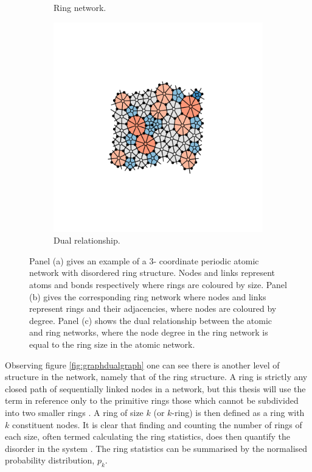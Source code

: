 \begin{figure}[bt]
\begin{subfigure}[b]{0.3\textwidth}
         \caption{Ring network.}
         \label{fig:graphdualdual}
     \end{subfigure}
     \hfill
     \begin{subfigure}[b]{0.3\textwidth}
         \centering
         \includegraphics[width=\textwidth]{./figures/methods/graph_dual.pdf}
         \caption{Dual relationship.}
         \label{}
     \end{subfigure}
     \hfill
     
     \caption{Panel (a) gives an example of a 3\-- coordinate periodic atomic network with disordered ring structure. Nodes and links represent atoms and bonds respectively where rings are coloured by size. Panel (b) gives the corresponding ring network where nodes and links represent rings and their adjacencies, where nodes are coloured by degree. Panel (c) shows the dual relationship between the atomic and ring networks, where the node degree in the ring network is equal to the ring size in the atomic network.}
     \label{fig:graphdual}
\end{figure}

Observing figure \ref{fig:graphdualgraph} one can see there is another level of structure in the network, namely that of the ring structure.
A ring is strictly any closed path of sequentially linked nodes in a network, but this thesis will use the term in reference only to the primitive rings \ie{} those which cannot be subdivided into two smaller rings \cite{Yuan2002}.
A ring of size $k$ (or $k$\--ring) is then defined as a ring with $k$ constituent nodes.
It is clear that finding and counting the number of rings of each size, often termed calculating the ring statistics, does then quantify the disorder in the system \cite{Kumar2014}.
The ring statistics can be summarised by the normalised probability distribution, $p_k$.

